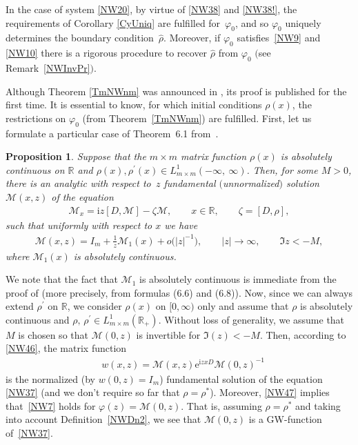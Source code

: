 \documentclass[pdftex]{sigma}
\newtheorem{Proposition}[Theorem]{Proposition}
{\theoremstyle{definition}
\newtheorem{Definition}[Theorem]{Definition}
\newtheorem{Notation}[Theorem]{Notation}
\newtheorem{Example}[Theorem]{Example}
\newtheorem{Remark}[Theorem]{Remark}
}
\def\vp{\varphi}
\def\wh{\widehat}
\def\BR{{\mathbb R}}
\newcommand{\E}{\mathrm{e}}
\newcommand{\I}{\mathrm{i}}
\newcommand{\cM}{{\mathcal M}}
\numberwithin{equation}{section}
\begin{document}
\begin{Remark}\label{RkDop}
In the case of system \eqref{NW20}, by virtue of
 \eqref{NW38} and \eqref{NW38!}, the requirements of Corollary \ref{CyUniq} are fulf\/illed for~$\vp_0$,
 and so $\vp_0$ uniquely determines the boundary condition~$\wh \rho$.
 Moreover, if $\vp_0$ satisf\/ies~\eqref{NW9} and \eqref{NW10} there is a rigorous procedure to recover
 $\wh \rho $ from $\vp_0$ $($see Remark~\ref{NWInvPr}$)$.
\end{Remark}

Although Theorem \ref{TmNWnm} was announced in \cite{SaARMS}, its proof is published for the f\/irst time.
It is essential to know, for which initial conditions $\rho(x)$, the restrictions on $\vp_0$ (from Theorem~\ref{TmNWnm})
are fulf\/illed. First, let us formulate a particular case of Theorem~6.1 from~\cite{BC0}.
\begin{Proposition} \label{NWPnBC} Suppose that the $m \times m$ matrix function $\rho(x)$ is absolutely continuous on $\BR$
and $\rho(x), \rho^{\prime}(x)\in
L^1_{m\times m}(-\infty, \ \infty)$. Then, for some $M>0$, there is an
analytic with respect to~$z$ fundamental $($unnormalized$)$ solution~$\cM(x,z)$
of the equation
\begin{gather}
 \cM_x=\I z [D, \cM]-\zeta \cM, \qquad x \in \BR, \qquad \zeta= [D, \rho] ,
 \label{NW46}
\end{gather}
such that uniformly with respect to $x$ we have
\begin{gather}
 \label{NW47}
\cM(x,z)=I_m+\frac{1}{z}\cM_1(x)+o\big(|z|^{-1}\big), \qquad |z| \to \infty, \qquad \Im z<-M,
\end{gather}
where $\cM_1(x)$ is absolutely continuous.
\end{Proposition}

We note that the fact that $\cM_1$ is absolutely continuous is immediate from the proof of
\cite[Theorem~6.1]{BC0} (more precisely, from formulas (6.6) and (6.8)). Now, since we can always
extend $\rho^{\prime}$ on $\BR$, we consider $\rho(x)$ on $[0,\infty)$ only and assume that $\rho$ is absolutely continuous
and $\rho, \, \rho^{\prime}\in
L^1_{m\times m}(\BR_+)$. Without loss of generality, we assume that $M$ is chosen so that $\cM(0,z)$ is invertible for
$\Im(z)<-M$. Then, according to \eqref{NW46}, the matrix function
\begin{align}&
w(x,z)=\cM(x,z)\E^{\I z x D}\cM(0,z)^{-1}
 \label{NW48}
\end{align}
is the normalized (by $w(0,z)=I_m$) fundamental solution of the equation \eqref{NW37} (and we don't require so far
that $\rho=\rho^*$).
Moreover, \eqref{NW47} implies that~\eqref{NW7} holds for $\vp(z)=\cM(0,z)$. That is, assuming $\rho=\rho^*$
and taking into account Def\/inition~\ref{NWDn2}, we see that
$\cM(0,z)$ is a GW-function of~\eqref{NW37}.
\end{document}
